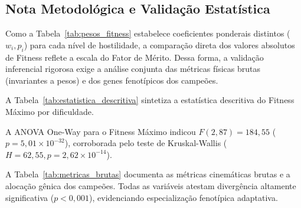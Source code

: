 \documentclass[10pt,conference,twocolumn]{article}
\begin{document}
\subsection{Nota Metodológica e Validação Estatística}
Como a Tabela~\ref{tab:pesos_fitness} estabelece coeficientes ponderais distintos ($w_i, p_i$) para cada nível de hostilidade, a comparação direta dos valores absolutos de Fitness reflete a escala do Fator de Mérito. Dessa forma, a validação inferencial rigorosa exige a análise conjunta das métricas físicas brutas (invariantes a pesos) e dos genes fenotípicos dos campeões.

A Tabela~\ref{tab:estatistica_descritiva} sintetiza a estatística descritiva do Fitness Máximo por dificuldade.

\begin{table}[h]
\centering
\caption{Estatística Descritiva do Fitness Máximo ($N = 90$)}
\label{tab:estatistica_descritiva}
\end{table}

A ANOVA One-Way para o Fitness Máximo indicou $F(2, 87) = 184{,}55$ ($p = 5{,}01 \times 10^{-32}$), corroborada pelo teste de Kruskal-Wallis ($H = 62{,}55, p = 2{,}62 \times 10^{-14}$).

A Tabela~\ref{tab:metricas_brutas} documenta as métricas cinemáticas brutas e a alocação gênica dos campeões. Todas as variáveis atestam divergência altamente significativa ($p < 0{,}001$), evidenciando especialização fenotípica adaptativa.
\end{document}
